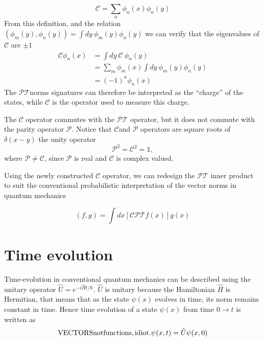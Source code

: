 \documentclass[12pt, a4paper]{report}
\newcommand\PT{\(\mathcal{PT}\)}
\newcommand\PP{\(\mathcal{P}\)}
\newcommand\CC{\(\mathcal{C}\)}
\begin{document}
\begin{equation}\label{eq:7}
\mathcal{C} = \sum_n \phi_n(x)\phi_n(y)
\end{equation}
From this definition, and the relation $(\phi_m(y), \phi_n(y)) = \int dy\:\phi_m(y)\phi_n(y)$ we can verify that the eigenvalues of \CC\: are $\pm 1$
\begin{align}\label{eq:7}
\mathcal{C} \phi_n(x) & = \int dy\:\mathcal{C}\:\phi_n(y)\nonumber \\
& = \sum_{m}\phi_m(x)\int dy\:\phi_m(y) \phi_n(y)\nonumber \\
& = (-1)^n \phi_n(x)
\end{align}
The \PT\:norms signatures can therefore be interpreted as the ``charge'' of the states, while \CC\: is the operator used to measure this charge\cite{Bender_2004}.

The \CC\: operator commutes with the \PT\: operator, but it does not commute with the parity operator \PP. Notice that \CC\:and \PP\: operators are square roots of $\delta(x-y)$ the unity operator\cite{ComplexExtension}
\begin{equation}\label{eq:8}
\mathcal{P}^2 = \mathcal{C}^2 = \mathds{1}, 
\end{equation}
where $\mathcal{P} \neq \mathcal{C}$, since \PP\: is real and \CC\: is complex valued\cite{MustaHbeHermitian}\cite{Bender_2004}.

Using the newly constructed \CC\: operator, we can redesign the \PT\: inner product to suit the conventional probabilistic interpretation of the vector norms in quantum mechanics

\begin{equation}\label{eq:9}
\left( f, g \right ) = \int dx \left [ \mathcal{CPT} f(x) \right ] g(x)
\end{equation}

\chapter{Time evolution}\label{TEv}
Time-evolution in conventional quantum mechanics can be described using the unitary operator $\hat{U} = e^{-i\hat{H}t/\hbar}$.
$\hat{U}$ is unitary because the Hamiltonian $\hat{H}$ is Hermitian, that means that as the state $\psi(x)$ evolves in time, its norm remains constant in time. Hence time evolution of a state $\psi(x)$ from time $0 \rightarrow t$ is written as
\begin{equation}\label{eq:10}
\mathrm{VECTORS not functions, idiot.}\\
\psi(x,t) = \hat{U} \psi(x, 0)
\end{equation}
\end{document}
